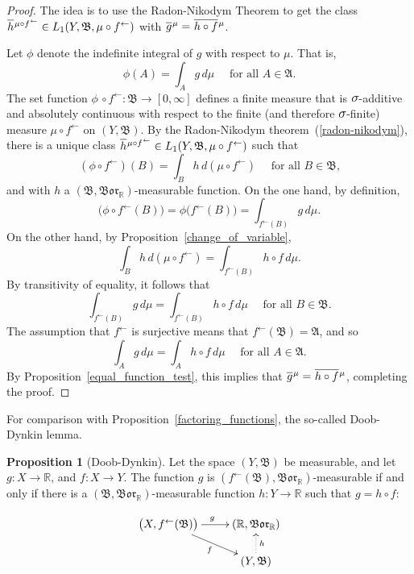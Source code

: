 \documentclass[
twoside=true,
paper=letter,
fontsize=11pt,
pagesize=auto,
leqno,
openany,
headsepline,
overfullrule,
]{scrbook}
\theoremstyle{plain}
\theoremstyle{plain}
\theoremstyle{definition}
\theoremstyle{bfnoteitalic}
\newtheorem{propboldnote}[thm]{Proposition}
\theoremstyle{bfnoteroman}
\newcommand{\sigalg}[1]{\mathfrak{#1}}
\newcommand{\borel}{\mathfrak{Bor}}
\newcommand{\textsigma}{\hbox{\large{$\sigma$}}\kern-1pt}
\newcommand{\preimage}[1]{#1^{\leftarrow}}
\newcommand{\R}{\mathbb{R}}
\newcommand{\sigmaalgebra}{\sigalg{A}}
\newcommand{\sigmaalgebraii}{\sigalg{B}}
\newcommand{\function}{f}
\newcommand{\functionii}{g}
\newcommand{\functioniii}{h}
\newcommand{\measurespace}{X}
\newcommand{\measurespaceii}{Y}
\newcommand{\measure}{\mu}
\newcommand*\xbar[1]{%
   \hbox{%
     \vbox{%
       \hrule height 0.4pt %
       \kern0.4ex%
       \hbox{%
         \ensuremath{#1}%
       }%
     }%
   }%
}
\newcommand{\lebclass}[1]{\hspace{.5pt}\xbar{#1}\hspace{0.5pt}}
\newcommand{\ellclass}[2]{\lebclass{#1}^{#2}}
\begin{document}
\begin{proof}
The idea is to use the Radon-Nikodym Theorem to get the class 
$\ellclass{h}{\measure\circ\preimage{f}}\in L_1 (\measurespaceii, \sigmaalgebraii, \measure\circ\preimage{f})$ with 
$\ellclass{g}{\measure}  
= 
\ellclass{h\circ f}{\measure}$.

Let $\phi$ denote the indefinite integral of $g$ with respect to 
$\measure$. That is,
\[
\phi(A)=\int_A g\,d\measure
\quad\text{ for all $A \in \sigmaalgebra$.}
\]
The set function 
$\phi\, \circ \preimage{f}:\sigmaalgebraii \to [0,\infty]$
defines a finite measure that is $\textsigma$-additive and absolutely continuous with respect to the finite (and therefore $\textsigma$-finite) measure
$\measure\circ\preimage{f}$
on $(\measurespaceii, \sigmaalgebraii)$.
By the Radon-Nikodym theorem~(\ref{radon-nikodym}), there is a unique class
$\ellclass{h}{\measure\circ\preimage{f}}\in L_1(\measurespaceii, \sigmaalgebraii, \measure\circ\preimage{f})$
such that
\[
(\phi\circ\preimage{f}) (B)
=
\int_B h \, d(\measure\circ\preimage{f})
\quad\text{ for all $B\in\sigmaalgebraii$,}
\]
and with $h$ a $(\sigmaalgebraii, \borel_\R)$\hyp{}measurable function.
On the one hand, by definition,
\[
\bigl(\phi\circ\preimage{f} (B)\bigr)
=
\phi\bigl(\preimage{f}(B)\bigr) 
= 
\int_{\preimage{f}(B)} g\, d\measure .
\]
On the other hand, by Proposition~\ref{change_of_variable},
\[
\int_B h \, d(\measure\circ\preimage{f})
=
\int_{\preimage{f}(B)} h\circ f \, d\measure .
\]
By transitivity of equality, it follows that
\[
\int_{\preimage{f}(B)} g\, d\measure
=
\int_{\preimage{f}(B)} h\circ f \, d\measure
\quad\text{ for all $B\in\sigmaalgebraii$.}
\]
The assumption that $\preimage{f}$ is surjective means that
$\preimage{f}(\sigmaalgebraii)=\sigmaalgebra$, and so
\[
\int_{A} g\, d\measure
=
\int_{A} h\circ f \, d\measure
\quad\text{ for all $A\in\sigmaalgebra$.}
\]
By Proposition~\ref{equal_function_test}, this implies that
$\ellclass{g}{\measure}  
= 
\ellclass{h\circ f}{\measure}$,
completing the proof.
\end{proof}


For comparison with Proposition~\ref{factoring_functions}, the so-called Doob-Dynkin lemma.

\begin{propboldnote}[Doob-Dynkin]\label{doob_dynkin}
Let the space $(\measurespaceii,\sigmaalgebraii)$ be measurable,
and let 
$\functionii:\measurespace\to\R$,
and
$\function:\measurespace\to\measurespaceii$.
The function $\functionii$ is
$(\preimage{\function}(\sigmaalgebraii),\borel_\R)$\hyp{}measurable if and only if there is a 
$(\sigmaalgebraii,\borel_\R)$\hyp{}measurable function
$\functioniii:\measurespaceii\to\R$ such that 
$\functionii=\functioniii\circ\function$:
\end{propboldnote}
\[
\xymatrix@R=16pt{
\bigl(\measurespace,\preimage{\function}(\sigmaalgebraii)\bigr) 
\ar[r]^\functionii
\ar[dr]_\function
& (\R,\borel_\R) \\
 & (\measurespaceii,\sigmaalgebraii) \ar@{.>}[u]_{\functioniii}\\
}
\]
\end{document}
